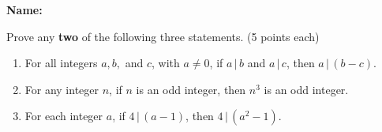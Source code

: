\documentclass[12pt]{article}
\renewcommand{\div}[2]{#1\, |\,#2}
\begin{document}
{\bf Name:}
\thispagestyle{fancy}

\bigskip


Prove any {\bf two} of the following three statements. (5 points each)
\begin{enumerate}
 \item For all integers $a, b,$ and $c$, with $a\neq 0$, if $\div{a}{b}$ and $\div{a}{c}$, then $\div{a}{(b-c)}$.
 \item For any integer $n$, if $n$ is an odd integer, then $n^3$ is an odd integer.
 \item For each integer $a$, if $\div{4}{(a-1)}$, then $\div{4}{(a^2-1)}$.
\end{enumerate}
\end{document}
